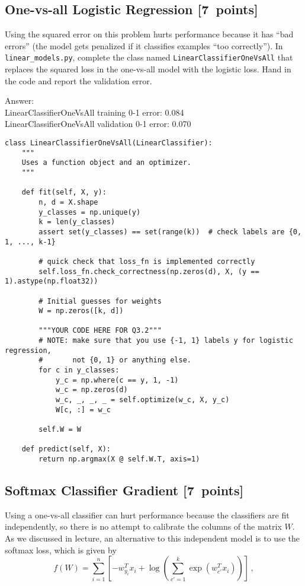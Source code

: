\documentclass{article}
\newcommand{\blu}[1]{{\textcolor{blu}{#1}}}
\newcommand{\gre}[1]{\textcolor{gre}{#1}}
\newcommand\ans[1]{\par\gre{Answer: #1}}
\let\ask\blu
\newcommand\pts[1]{\textcolor{pointscolour}{[#1~points]}}
\begin{document}
\newpage

\subsection{One-vs-all Logistic Regression \pts{7}}

Using the squared error on this problem hurts performance because it has ``bad errors'' (the model gets penalized if it classifies examples ``too correctly''). In \verb|linear_models.py|, complete the class named \verb|LinearClassifierOneVsAll| that replaces the squared loss in the one-vs-all model with the logistic loss. \ask{Hand in the code and report the validation error}.

\ans{\\
LinearClassifierOneVsAll training 0-1 error: 0.084\\
LinearClassifierOneVsAll validation 0-1 error: 0.070\\}
\begin{verbatim}
class LinearClassifierOneVsAll(LinearClassifier):
    """
    Uses a function object and an optimizer.
    """

    def fit(self, X, y):
        n, d = X.shape
        y_classes = np.unique(y)
        k = len(y_classes)
        assert set(y_classes) == set(range(k))  # check labels are {0, 1, ..., k-1}

        # quick check that loss_fn is implemented correctly
        self.loss_fn.check_correctness(np.zeros(d), X, (y == 1).astype(np.float32))

        # Initial guesses for weights
        W = np.zeros([k, d])

        """YOUR CODE HERE FOR Q3.2"""
        # NOTE: make sure that you use {-1, 1} labels y for logistic regression,
        #       not {0, 1} or anything else.
        for c in y_classes:
            y_c = np.where(c == y, 1, -1)
            w_c = np.zeros(d)
            w_c, _, _, _ = self.optimize(w_c, X, y_c)
            W[c, :] = w_c

        self.W = W

    def predict(self, X):
        return np.argmax(X @ self.W.T, axis=1)
\end{verbatim}
\newpage
\subsection{Softmax Classifier Gradient \pts{7}}

Using a one-vs-all classifier can hurt performance because the classifiers are fit independently, so there is no attempt to calibrate the columns of the matrix $W$. As we discussed in lecture, an alternative to this independent model is to use the softmax loss, which is given by
\[
f(W) = \sum_{i=1}^n \left[-w_{y_i}^Tx_i + \log\left(\sum_{c' = 1}^k \exp(w_{c'}^Tx_i)\right)\right] \, ,
\]
\end{document}
